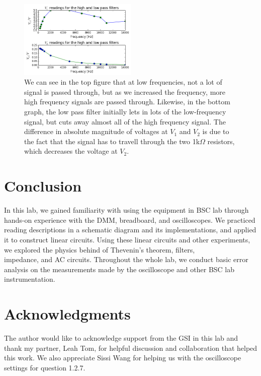 \documentclass[authoryear, 12pt,5p, times]{elsarticle}
\begin{document}
\begin{figure}[h!]
\includegraphics[width=0.5\textwidth]{figure/filter_plot}
\caption{We can see in the top figure that at low frequencies, not a lot of signal is passed through, but as we increased the frequency, more high frequency signals are passed through. Likewise, in the bottom graph, the low pass filter initially lets in lots of the low-frequency signal, but cuts away almost all of the high frequency signal. The difference in absolute magnitude of voltages at $V_1$ and $V_2$ is due to the fact that the signal has to travell through the two 1k$\Omega$ resistors, which decreases the voltage at $V_2$. }
\label{filter_plot}
\end{figure}
 \section{Conclusion}
In this lab, we gained familiarity with using the equipment in BSC lab through hands-on experience with the DMM, breadboard, and oscilloscopes. We practiced reading descriptions in a schematic diagram and its implementations, and applied it to construct linear circuits. Using these linear circuits and other experiments, we explored the physics behind of Thevenin's theorem, filters, \\impedance, and AC circuits. Throughout the whole lab, we conduct basic error analysis on the measurements made by the oscilloscope and other BSC lab instrumentation.
\section*{Acknowledgments}
\begin{footnotesize}
The author would like to acknowledge support from the GSI in this lab and thank my partner, Leah Tom, for helpful discussion and collaboration that helped this work. We also appreciate Sissi Wang for helping us with the oscilloscope settings for question 1.2.7.
\end{footnotesize}
\end{document}
